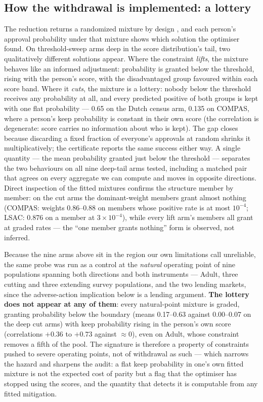 \documentclass[conference]{IEEEtran}
\begin{document}
\subsection{How the withdrawal is implemented: a lottery}
\label{sec:lottery}

The reduction returns a randomized mixture by design \cite{agarwal2018}, and each person's
approval probability under that mixture shows which solution the optimiser found. On
threshold-sweep arms deep in the score distribution's tail, two qualitatively different
solutions appear. Where the constraint \emph{lifts}, the mixture behaves like an informed
adjustment: probability is granted below the threshold, rising with the person's score,
with the disadvantaged group favoured within each score band. Where it \emph{cuts}, the
mixture is a lottery: nobody below the threshold receives any probability at all, and
every predicted positive of both groups is kept with one flat probability --- 0.65 on the
Dutch census arm, 0.135 on COMPAS, where a person's keep probability is constant in their
own score (the correlation is degenerate: score carries no information about who is kept). The gap closes because discarding a fixed
fraction of everyone's approvals at random shrinks it multiplicatively; the certificate
reports the same success either way. A single quantity --- the mean probability granted
just below the threshold --- separates the two behaviours on all nine deep-tail arms
tested, including a matched pair that agrees on every aggregate we can compute and moves
in opposite directions. Direct inspection of the fitted mixtures confirms the structure
member by member: on the cut arms the dominant-weight members grant almost nothing
(COMPAS: weights 0.86--0.88 on members whose positive rate is at most $10^{-4}$; LSAC:
0.876 on a member at $3 \times 10^{-4}$), while every lift arm's members all grant at
graded rates --- the ``one member grants nothing'' form is observed, not inferred.

Because the nine arms above sit in the region our own limitations call unreliable, the
same probe was run as a control at the \emph{natural} operating point of nine
populations spanning both directions and both instruments --- Adult, three cutting and
three extending survey populations, and the two lending markets, since the
adverse-action implication below is a lending argument. \textbf{The lottery does not
appear at any of them}: every natural-point
mixture is graded, granting probability below the boundary (means 0.17--0.63 against
0.00--0.07 on the deep cut arms) with keep probability rising in the person's own score
(correlations $+0.36$ to $+0.73$ against $\approx 0$), even on Adult, whose constraint
removes a fifth of the pool. The signature is therefore a property of constraints pushed
to severe operating points, not of withdrawal as such --- which narrows the hazard and
sharpens the audit: a flat keep probability in one's own fitted mixture is not the
expected cost of parity but a flag that the optimiser has stopped using the scores, and
the quantity that detects it is computable from any fitted mitigation.
\end{document}

